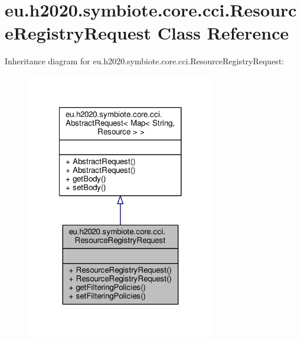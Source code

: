 \hypertarget{classeu_1_1h2020_1_1symbiote_1_1core_1_1cci_1_1ResourceRegistryRequest}{}\section{eu.\+h2020.\+symbiote.\+core.\+cci.\+Resource\+Registry\+Request Class Reference}
\label{classeu_1_1h2020_1_1symbiote_1_1core_1_1cci_1_1ResourceRegistryRequest}


Inheritance diagram for eu.\+h2020.\+symbiote.\+core.\+cci.\+Resource\+Registry\+Request\+:
\nopagebreak
\begin{figure}[H]
\begin{center}
\leavevmode
\includegraphics[width=234pt]{classeu_1_1h2020_1_1symbiote_1_1core_1_1cci_1_1ResourceRegistryRequest__inherit__graph}
\end{center}
\end{figure}


